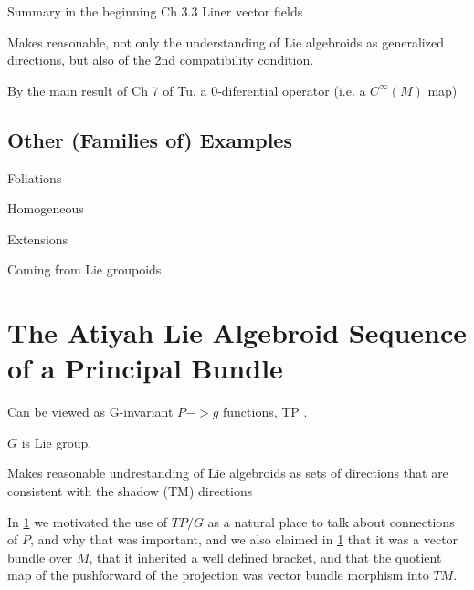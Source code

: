 Summary in the beginning Ch 3.3 Liner vector fields

Makes reasonable, not only the understanding of Lie algebroids as generalized directions, but also of the 2nd compatibility condition.

By the main result of Ch 7 of Tu, a $0$-diferential operator (i.e. a $C^\infty(M)$ map)

\subsection{Other (Families of) Examples}

Foliations

Homogeneous

Extensions

Coming from Lie groupoids

\section{The Atiyah Lie Algebroid Sequence of a Principal Bundle}

Can be viewed as G-invariant $P-> g$ functions, TP .

$G$ is Lie group.

Makes reasonable undrestanding of Lie algebroids as sets of directions that are consistent with the shadow (TM) directions

In \ref{} we motivated the use of $TP/G$ as a natural place to talk about connections of $P$, and why that was important, and we also claimed in \ref{} that it was a vector bundle over $M$, that it inherited a well defined bracket, and that the quotient map of the pushforward of the projection was vector bundle morphism into $TM$.


